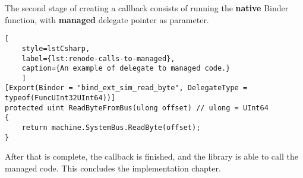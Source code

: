 \pagebreak

\noindent
The second stage of creating a callback consists of running the \textbf{native} Binder function, with \textbf{managed}
delegate pointer as parameter.

\begin{lstlisting}[
    style=lstCsharp,
    label={lst:renode-calls-to-managed},
    caption={An example of delegate to managed code.}
    ]
[Export(Binder = "bind_ext_sim_read_byte", DelegateType = typeof(FuncUInt32UInt64))]
protected uint ReadByteFromBus(ulong offset) // ulong = UInt64
{
    return machine.SystemBus.ReadByte(offset);
}
\end{lstlisting}

\noindent
After that is complete, the callback is finished, and the library is able to call the managed code. This concludes the
implementation chapter.